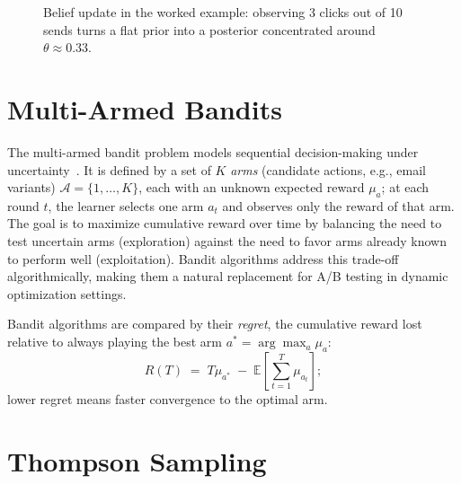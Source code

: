 \begin{figure}[htbp]
    \centering
    \caption{Belief update in the worked example: observing 3 clicks out of 10 sends
    turns a flat prior into a posterior concentrated around $\theta \approx 0.33$.}
    \label{fig:beta_update}
\end{figure}

\section{Multi-Armed Bandits}
\label{sec:bg_mab}

The multi-armed bandit problem models sequential decision-making under uncertainty~\cite{auer2002finite}. It is defined by a set of $K$ \emph{arms} (candidate actions, e.g., email variants) $\mathcal{A} = \{1, \dots, K\}$, each with an unknown expected reward $\mu_a$; at each round $t$, the learner selects one arm $a_t$ and observes only the reward of that arm. The goal is to maximize cumulative reward over time by balancing the need to test uncertain arms (exploration) against the need to favor arms already known to perform well (exploitation). Bandit algorithms address this trade-off algorithmically, making them a natural replacement for A/B testing in dynamic optimization settings.

Bandit algorithms are compared by their \emph{regret}, the cumulative reward lost relative to always playing the best arm $a^{*} = \arg\max_a \mu_a$:
\begin{equation}
    R(T) \;=\; T \mu_{a^{*}} \;-\; \mathbb{E}\!\left[\sum_{t=1}^{T} \mu_{a_t}\right];
    \label{eq:regret}
\end{equation}
lower regret means faster convergence to the optimal arm.

\section{Thompson Sampling}

